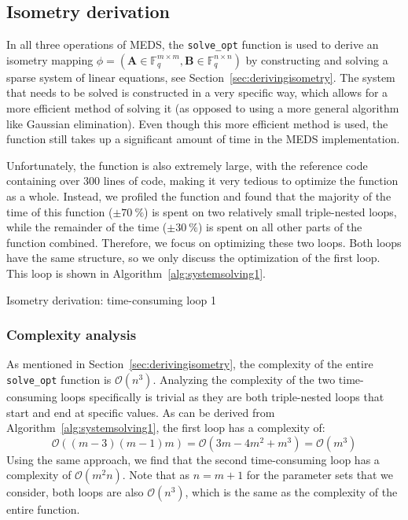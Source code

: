 \documentclass[11pt,a4paper]{report}
\theoremstyle{definition}
\begin{document}
\subsection{Isometry derivation}
\label{sec:isometryderivation}
In all three operations of MEDS, the \texttt{solve\_opt} function is used to derive an isometry mapping $\phi = (\textbf{A} \in \mathbb{F}_q^{m \times m}, \textbf{B} \in \mathbb{F}_q^{n \times n})$ by constructing and solving a sparse system of linear equations, see Section~\ref{sec:derivingisometry}. The system that needs to be solved is constructed in a very specific way, which allows for a more efficient method of solving it (as opposed to using a more general algorithm like Gaussian elimination). Even though this more efficient method is used, the function still takes up a significant amount of time in the MEDS implementation.

Unfortunately, the function is also extremely large, with the reference code containing over 300 lines of code, making it very tedious to optimize the function as a whole. Instead, we profiled the function and found that the majority of the time of this function ($\pm 70~\%$) is spent on two relatively small triple-nested loops, while the remainder of the time ($\pm 30~\%$) is spent on all other parts of the function combined. Therefore, we focus on optimizing these two loops. Both loops have the same structure, so we only discuss the optimization of the first loop. This loop is shown in Algorithm~\ref{alg:systemsolving1}.

\begin{algorithm}
  \caption{Isometry derivation: time-consuming loop 1}
  \label{alg:systemsolving1}
  
\end{algorithm}

\subsubsection{Complexity analysis}
\label{sec:isometryderivationcomplexity}
As mentioned in Section~\ref{sec:derivingisometry}, the complexity of the entire \texttt{solve\_opt} function is $\mathcal{O}(n^3)$. Analyzing the complexity of the two time-consuming loops specifically is trivial as they are both triple-nested loops that start and end at specific values. As can be derived from Algorithm~\ref{alg:systemsolving1}, the first loop has a complexity of:
\[
  \mathcal{O}((m-3)(m-1)m) = \mathcal{O}(3m - 4m^2 + m^3) = \mathcal{O}(m^3)
\]
Using the same approach, we find that the second time-consuming loop has a complexity of $\mathcal{O}(m^2n)$. Note that as $n = m + 1$ for the parameter sets that we consider, both loops are also $\mathcal{O}(n^3)$, which is the same as the complexity of the entire function.
\end{document}
